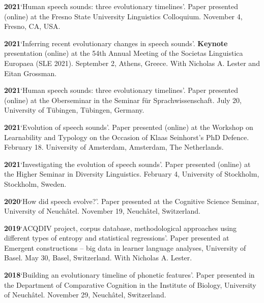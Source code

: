 \documentclass[11pt]{article}
\newcommand{\hangpara}{
 \setlength{\parindent}{0in} %
 \hangindent=0.42in %
}
\begin{document}
\vskip 6pt
\hangpara
{\bf 2021}\hspace{1ex}`Human speech sounds: three evolutionary timelines'. Paper presented (online) at the Fresno State University Linguistics Colloquium. November 4, Fresno, CA, USA.

\vskip 6pt
\hangpara
{\bf 2021}\hspace{1ex}`Inferring recent evolutionary changes in speech sounds'. \textbf{Keynote} presentation (online) at the 54th Annual Meeting of the Societas Linguistica Europaea (SLE 2021). September 2, Athens, Greece. With Nicholas A. Lester and Eitan Grossman.

\vskip 6pt
\hangpara
{\bf 2021}\hspace{1ex}`Human speech sounds: three evolutionary timelines'. Paper presented (online) at the Oberseminar in the Seminar für Sprachwissenschaft. July 20, University of Tübingen, Tübingen, Germany.

\vskip 6pt
\hangpara
{\bf 2021}\hspace{1ex}`Evolution of speech sounds'. Paper presented (online) at the Workshop on Learnability and Typology
on the Occasion of Klaas Seinhorst’s PhD Defence. February 18. University of Amsterdam, Amsterdam, The Netherlands.

\vskip 6pt
\hangpara
{\bf 2021}\hspace{1ex}`Investigating the evolution of speech sounds'. Paper presented (online) at the Higher Seminar in Diversity Linguistics. February 4, University of Stockholm, Stockholm, Sweden.

\vskip 6pt
\hangpara
{\bf 2020}\hspace{1ex}`How did speech evolve?'. Paper presented at the Cognitive Science Seminar, University of Neuchâtel. November 19, Neuchâtel, Switzerland.

\vskip 6pt
\hangpara
{\bf 2019}\hspace{1ex}`ACQDIV project, corpus database, methodological approaches using different types of entropy and statistical regressions'. Paper presented at Emergent constructions -- big data in learner language analyses, University of Basel. May 30, Basel, Switzerland. With Nicholas A. Lester.

\vskip 6pt
\hangpara
{\bf 2018}\hspace{1ex}`Building an evolutionary timeline of phonetic features'. Paper presented in the Department of Comparative Cognition in the Institute of Biology, University of Neuchâtel. November 29, Neuchâtel, Switzerland.
\end{document}
